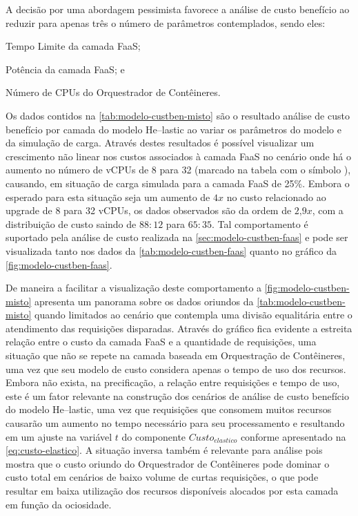 \documentclass[english,brazilian]{UNISINOSmonografia} %
\begin{document}
A decisão por uma abordagem pessimista favorece a análise de custo benefício ao reduzir para apenas três o número de parâmetros contemplados, sendo eles: 
\begin{inparaenum}[(i)]
	\item Tempo Limite da camada FaaS;
	\item Potência da camada FaaS; e
	\item Número de CPUs do Orquestrador de Contêineres.
\end{inparaenum}
Os dados contidos na \autoref{tab:modelo-custben-misto} são o resultado análise de custo benefício por camada do modelo \textsf{He}--lastic ao variar os parâmetros do modelo e da simulação de carga.
Através destes resultados é possível visualizar um crescimento não linear nos custos associados à camada FaaS no cenário onde há o aumento no número de vCPUs de 8 para 32 (marcado na tabela com o símbolo \dag), causando, em situação de carga simulada para a camada FaaS de 25\%.
Embora o esperado para esta situação seja um aumento de $4x$ no custo relacionado ao upgrade de 8 para 32 vCPUs, os dados observados são da ordem de $2\text{,}9x$, com a distribuição de custo saindo de $88:12$ para $65:35$.
Tal comportamento é suportado pela análise de custo realizada na \autoref{sec:modelo-custben-faas} e pode ser visualizada tanto nos dados da \autoref{tab:modelo-custben-faas} quanto no gráfico da \autoref{fig:modelo-custben-faas}.



De maneira a facilitar a visualização deste comportamento a \autoref{fig:modelo-custben-misto} apresenta um panorama sobre os dados oriundos da \autoref{tab:modelo-custben-misto} quando limitados ao cenário que contempla uma divisão equalitária entre o atendimento das requisições disparadas.
Através do gráfico fica evidente a estreita relação entre o custo da camada FaaS e a quantidade de requisições, uma situação que não se repete na camada baseada em Orquestração de Contêineres, uma vez que seu modelo de custo considera apenas o tempo de uso dos recursos.
Embora não exista, na precificação, a relação entre requisições e tempo de uso, este é um fator relevante na construção dos cenários de análise de custo benefício do modelo \textsf{He}--lastic, uma vez que requisições que consomem muitos recursos causarão um aumento no tempo necessário para seu processamento e resultando em um ajuste na variável $t$ do componente $Custo_{elastico}$ conforme apresentado na \autoref{eq:custo-elastico}.
A situação inversa também é relevante para análise pois mostra que o custo oriundo do Orquestrador de Contêineres pode dominar o custo total em cenários de baixo volume de curtas requisições, o que pode resultar em baixa utilização dos recursos disponíveis alocados por esta camada em função da ociosidade.
\end{document}
